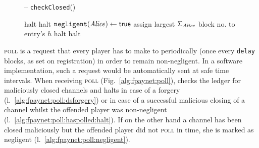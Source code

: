\begin{figure}[H]
\begin{systembox}{\fpaynet{} -- \texttt{checkClosed}()}
\begin{algorithmic}[1]
              \State halt 
              \label{alg:fpaynet:close:func:dsforgery}
              \label{alg:fpaynet:close:func:ifmalicious}
                \State halt
                \label{alg:fpaynet:close:func:malicious}
              \Else
                \State $\mathtt{negligent}(\mathit{Alice}) \gets \mathsf{true}$
              \EndIf
              \State assign largest $\Sigma_{\mathit{Alice}}$ block no. to
              entry's $h$
            \label{alg:fpaynet:close:func:ifidle}
              \State halt
              \label{alg:fpaynet:close:func:idle}
            \EndIf
          \EndFor
            \State halt
            \label{alg:fpaynet:close:func:balance}
          \EndIf
        \EndFunction
        \label{alg:fpaynet:close:func:end}
      \end{algorithmic}
    \end{systembox}
    \caption{}
    \label{alg:fpaynet:close:func}
  \end{figure}

  \textsc{poll} is a request that every player has to make to \fpaynet{}
  periodically (once every \texttt{delay} blocks, as set on registration) in
  order to remain non-negligent. In a software implementation, such a request
  would be automatically sent at safe time intervals. When receiving
  \textsc{poll} (Fig.~\ref{alg:fpaynet:poll}), \fpaynet{} checks the ledger for
  maliciously closed channels and halts in case of a forgery
  (l.~\ref{alg:fpaynet:poll:dsforgery}) or in case of a successful malicious
  closing of a channel whilst the offended player was non-negligent
  (l.~\ref{alg:fpaynet:poll:haspolled:halt}). If on the other hand a channel has
  been closed maliciously but the offended player did not \textsc{poll} in time,
  she is marked as negligent (l.~\ref{alg:fpaynet:poll:negligent}).

